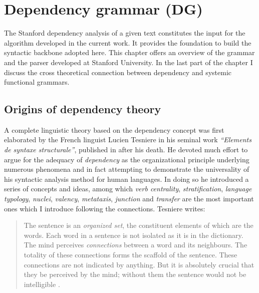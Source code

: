 \chapter{Dependency grammar (DG)}
\label{ch:dependency-grammar}

    The Stanford dependency analysis of a given text constitutes the input for the algorithm developed in the current work. It provides the foundation to build the syntactic backbone adopted here. This chapter offers an overview of the grammar and the parser developed at Stanford University. In the last part of the chapter I discuss the cross theoretical connection between dependency and systemic functional grammars. 

\section{Origins of dependency theory}
\label{sec:origins}
    A complete linguistic theory based on the dependency concept was first elaborated by the French linguist Lucien Tesniere in his seminal work \textit{``Elements de syntaxe structurale''}, published in \citeyear{Tesniere59} after his death. He devoted much effort to argue for the adequacy of \textit{dependency} as the organizational principle underlying numerous phenomena and in fact attempting to demonstrate the universality of his syntactic analysis method for human languages. In doing so he introduced a series of concepts and ideas, among which \textit{verb centrality}, \textit{stratification}, \textit{language typology}, \textit{nuclei}, \textit{valency}, \textit{metataxis}, \textit{junction} and \textit{transfer} are the most important ones which I introduce following the connections. Tesniere writes:

    
    \begin{quotation}
        The sentence is an \textit{organized set}, the constituent elements of which are the words. Each word in a sentence is not isolated as it is in the dictionary. The mind perceives \textit{connections} between a word and its neighbours. The totality of these connections forms the scaffold of the sentence. These connections are not indicated by anything. But it is absolutely crucial that they be perceived by the mind; without them the sentence would not be intelligible \citep[3]{Tesniere2015}.
    \end{quotation}

